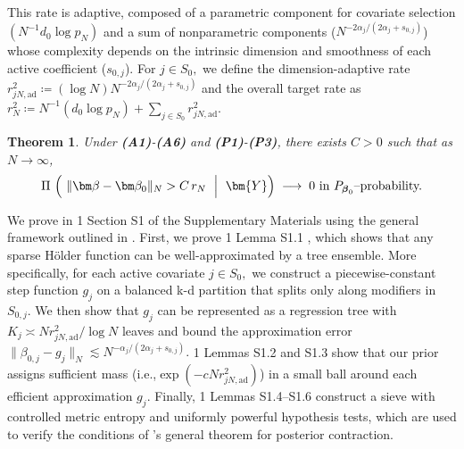 \documentclass[11pt]{article}
\newcommand{\bbeta}{\boldsymbol{\beta}}
\theoremstyle{plain}
\newtheorem{theorem}{Theorem}
\theoremstyle{definition}
\theoremstyle{plain}
\newcommand{\includesupp}{1}
\newcommand{\switchref}[2]{%
  \if\includesupp1%
    #1%
  \else%
    #2%
  \fi%
}
\begin{document}
This rate is adaptive, composed of a parametric component for covariate selection $(N^{-1}d_0 \log p_N)$ and a sum of nonparametric components ($N^{-2\alpha_j/(2 \alpha_j+s_{0,j})}$) whose complexity depends on the intrinsic dimension and smoothness of each active coefficient ($s_{0,j}$). 
For $j \in S_0,$ we define the dimension-adaptive rate $r_{jN,\text{ad}} ^2 \coloneqq (\log N)N^{-2\alpha_j/(2 \alpha_j+s_{0,j})}$ and the overall target rate as $r_N^2
\coloneqq
N^{-1}(d_0\log p_N) + \sum_{j\in S_0} r_{jN,\mathrm{ad}}^2.$
\begin{theorem}
\label{thm:contraction-main}
Under \textbf{(A1)}-\textbf{(A6)} and \textbf{(P1)}-\textbf{(P3)}, there exists $C>0$ such that as $N \rightarrow \infty$,
\[
\Pi \ \Big(\ \|\bm\beta-\bm\beta_0\|_N > C\,r_N \ \Bigm|\ \bm{Y}\Big)
\;\longrightarrow\; 0
\ \text{in $P_{\bbeta_0}$–probability.}
\]
\end{theorem}

We prove  in \switchref{}{Section S1 of the Supplementary Materials} using the general framework outlined in \citet{Ghosal2000}. 
First, we prove \switchref{}{Lemma S1.1}, which shows that any sparse H\"older function can be well-approximated by a tree ensemble.
More specifically, for each active covariate $j \in S_{0},$ we construct a piecewise-constant step function $g_{j}$ on a balanced k-d partition that splits only along modifiers in $S_{0,j}.$
We then show that $g_{j}$ can be represented as a regression tree with $K_j \asymp N r_{jN,\textrm{ad}}^2/\log N$ leaves and bound the approximation error $\| \beta_{0,j}-g_j \|_N \lesssim N^{-\alpha_j/(2\alpha_j + s_{0,j})}.$
\switchref{}{Lemmas S1.2 and S1.3} show that our prior assigns sufficient mass (i.e.,$\exp(-c N r_{jN,\mathrm{ad}}^2)$) in a small ball around each efficient approximation $g_{j}.$
Finally, \switchref{}{Lemmas S1.4--S1.6} construct a sieve with controlled metric entropy and uniformly powerful hypothesis tests, which are used to verify the conditions of \citet{Ghosal2000}'s general theorem for posterior contraction.


\end{document}
